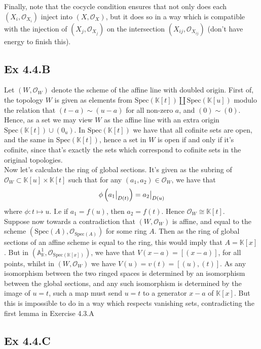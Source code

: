 \documentclass{article}
\newcommand\restr[2]{{%
  \left.\kern-\nulldelimiterspace %
  #1 %
  \vphantom{\big|} %
  \right|_{#2} %
  }}
\theoremstyle{definition}
\newcommand{\K}{\mathbb{K}}
\newcommand{\A}{\mathbb{A}}
\newcommand{\oo}{\mathcal{O}}
\newcommand{\osp}[1]{\oo_{\Spec\left(#1\right)}}
\renewcommand{\AA}[1]{\A^{#1}}
\newcommand{\Spec}{\text{Spec}}
\begin{document}
Finally, note that the cocycle condition ensures that not only does each $(X_i,
	\oo_{X_i})$ inject into $(X, \oo_X)$, but it does so in a way which is
compatible with the injection of $(X_j, \oo_{X_j})$ on the intersection
$(X_{ij}, \oo_{X_{ij}})$ (don't have energy to finish this).


\subsection*{Ex 4.4.B}

Let $(W, \oo_W)$ denote the scheme of the affine line with doubled origin.
First of, the topology $W$ is given as elements from $\Spec(\K[t]) \coprod
	\Spec(\K[u])$ modulo the relation that $(t - a) \sim (u - a)$ for all non-zero
$a$, and $(0) \sim (0)$. Hence, as a set we may view $W$ as the affine line
with an extra origin $\Spec(\K[t]) \cup (0_u)$. In $\Spec(\K[t])$ we have that
all cofinite sets are open, and the same in $\Spec(\K[t])$, hence a set in $W$
is open if and only if it's cofinite, since that's exactly the sets which
correspond to cofinite sets in the original topologies. \\

Now let's calculate the ring of global sections. It's given as the subring of
$\oo_W \subset \K[u] \times \K[t]$ such that for any $(a_1, a_2) \in
	\oo_W$, we have that
\[
	\phi\left(\restr{a_1}{D(t)}\right)
	=
	\restr{a_2}{D(u)}
\]
where $\phi : t \mapsto u$. I.e if $a_1 = f(u)$, then $a_2 = f(t)$. Hence
$\oo_W \cong \K[t]$. \\

Suppose now towards a contradiction that $(W, \oo_W)$ is affine, and equal to
the scheme $(\Spec(A), \osp{A})$ for some ring $A$. Then as the ring of global
sections of an affine scheme is equal to the ring, this would imply that $A =
	\K[x]$. But in $(\AA{1}_{\K}, \osp{\K[x]})$, we have that $V(x - a) = [(x -
	a)]$, for all points, whilst in $(W, \oo_W)$ we have $V(u) = v(t) = [(u),
	(t)]$. As any isomorphism between the two ringed spaces is determined by an
isomorphism between the global sections, and any such isomorphism is determined
by the image of $u = t$, such a map must send $u = t$ to a generator $x - a$ of
$\K[x]$. But this is impossible to do in a way which respects vanishing sets,
contradicting the first lemma in Exercise 4.3.A

\subsection*{Ex 4.4.C}
\end{document}
